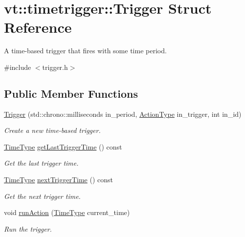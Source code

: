 \hypertarget{structvt_1_1timetrigger_1_1_trigger}{}\section{vt\+:\+:timetrigger\+:\+:Trigger Struct Reference}
\label{structvt_1_1timetrigger_1_1_trigger}


A time-\/based trigger that fires with some time period.  




{\ttfamily \#include $<$trigger.\+h$>$}

\subsection*{Public Member Functions}
\begin{DoxyCompactItemize}
\item 
\hyperlink{structvt_1_1timetrigger_1_1_trigger_aa457c370c31674979005504c703e2df4}{Trigger} (std\+::chrono\+::milliseconds in\+\_\+period, \hyperlink{namespacevt_ae0a5a7b18cc99d7b732cb4d44f46b0f3}{Action\+Type} in\+\_\+trigger, int in\+\_\+id)
\begin{DoxyCompactList}\small\item\em Create a new time-\/based trigger. \end{DoxyCompactList}\item 
\hyperlink{namespacevt_a876a9d0cd5a952859c72de8a46881442}{Time\+Type} \hyperlink{structvt_1_1timetrigger_1_1_trigger_a4065ece0b3f17ee3780b045e3520aaf5}{get\+Last\+Trigger\+Time} () const
\begin{DoxyCompactList}\small\item\em Get the last trigger time. \end{DoxyCompactList}\item 
\hyperlink{namespacevt_a876a9d0cd5a952859c72de8a46881442}{Time\+Type} \hyperlink{structvt_1_1timetrigger_1_1_trigger_a77c78026bc618f6084ecda2a3e0198ba}{next\+Trigger\+Time} () const
\begin{DoxyCompactList}\small\item\em Get the next trigger time. \end{DoxyCompactList}\item 
void \hyperlink{structvt_1_1timetrigger_1_1_trigger_a44688f64be94b9c821768b55a3a236f7}{run\+Action} (\hyperlink{namespacevt_a876a9d0cd5a952859c72de8a46881442}{Time\+Type} current\+\_\+time)
\begin{DoxyCompactList}\small\item\em Run the trigger. \end{DoxyCompactList}\item 

\end{DoxyCompactItemize}
